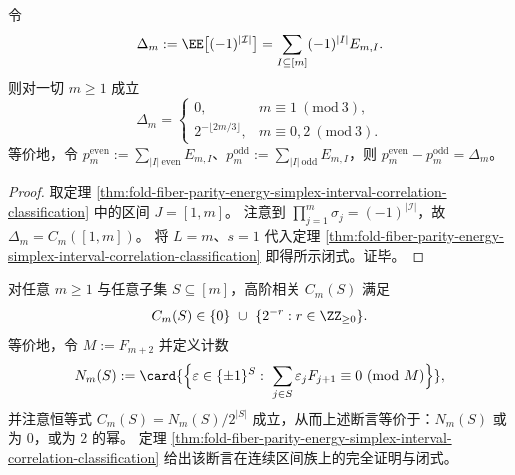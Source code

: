 \begin{corollary}\label{cor:fold-fiber-parity-energy-simplex-global-parity-mod3}
令
\[
\Delta_m:=\EE\big[(-1)^{|\mathcal I|}\big]
=\sum_{I\subseteq[m]}(-1)^{|I|}E_{m,I}.
\]
则对一切 \(m\ge 1\) 成立
\[
\Delta_m=
\begin{cases}
0, & m\equiv 1\ (\mathrm{mod}\ 3),\\[4pt]
2^{-\lfloor 2m/3\rfloor}, & m\equiv 0,2\ (\mathrm{mod}\ 3).
\end{cases}
\]
等价地，令 \(p_m^{\mathrm{even}}:=\sum_{|I|\ \mathrm{even}}E_{m,I}\)、\(p_m^{\mathrm{odd}}:=\sum_{|I|\ \mathrm{odd}}E_{m,I}\)，则 \(p_m^{\mathrm{even}}-p_m^{\mathrm{odd}}=\Delta_m\)。
\end{corollary}
\begin{proof}
取定理 \ref{thm:fold-fiber-parity-energy-simplex-interval-correlation-classification} 中的区间 \(J=[1,m]\)。
注意到 \(\prod_{j=1}^m\sigma_j=(-1)^{|\mathcal I|}\)，故 \(\Delta_m=C_m([1,m])\)。
将 \(L=m\)、\(s=1\) 代入定理 \ref{thm:fold-fiber-parity-energy-simplex-interval-correlation-classification} 即得所示闭式。证毕。
\end{proof}

\begin{conjecture}[任意高阶相关的二幂律]\label{conj:fold-fiber-parity-energy-simplex-dyadic-correlation}
对任意 \(m\ge 1\) 与任意子集 \(S\subseteq[m]\)，高阶相关 \(C_m(S)\) 满足
\[
C_m(S)\in \{0\}\ \cup\ \{2^{-r}: r\in\ZZ_{\ge 0}\}.
\]
等价地，令 \(M:=F_{m+2}\) 并定义计数
\[
N_m(S):=\card{\Bigl\{\varepsilon\in\{\pm1\}^{S}:\ \sum_{j\in S}\varepsilon_jF_{j+1}\equiv 0\ (\mathrm{mod}\ M)\Bigr\}},
\]
并注意恒等式 \(C_m(S)=N_m(S)/2^{|S|}\) 成立，从而上述断言等价于：\(N_m(S)\) 或为 \(0\)，或为 \(2\) 的幂。
定理 \ref{thm:fold-fiber-parity-energy-simplex-interval-correlation-classification} 给出该断言在连续区间族上的完全证明与闭式。
\end{conjecture}

\endinput
